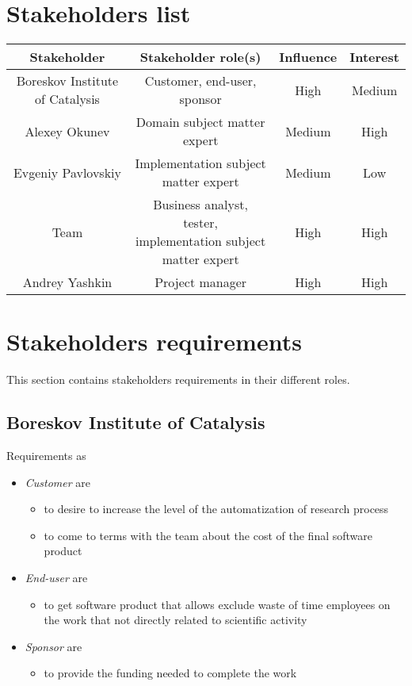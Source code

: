 \section{Stakeholders list}

\begin{tabular}{ | c | c | c | c | }
	\hline
	\textbf{Stakeholder} & \textbf{Stakeholder role(s)} & \textbf{Influence} & \textbf{Interest} \\ \hline
	Boreskov Institute of Catalysis & Customer, end-user, sponsor & High & Medium \\ \hline
	Alexey Okunev & Domain subject matter expert & Medium & High \\ \hline
	Evgeniy Pavlovskiy & Implementation subject matter expert & Medium & Low \\ \hline
	Team &  \specialcell{Business analyst, tester, \\ implementation subject matter expert} & High & High \\ \hline
	Andrey Yashkin & Project manager & High & High \\ \hline
\end{tabular}


\section{Stakeholders requirements}

This section contains stakeholders requirements in their different roles.

\subsection{Boreskov Institute of Catalysis}

Requirements as
\begin{itemize}
	\item \textit{Customer} are
	\begin{itemize}
		\item to desire to increase the level of the automatization of research process
		\item to come to terms with the team about the cost of the final software product
	\end{itemize}
	\item \textit{End-user} are
	\begin{itemize}
		\item  to get software product that allows exclude waste of time employees on the work
		that not directly related to scientific activity
	\end{itemize}
	\item \textit{Sponsor} are
	\begin{itemize}
		\item to provide the funding needed to complete the work
	\end{itemize}
\end{itemize}

